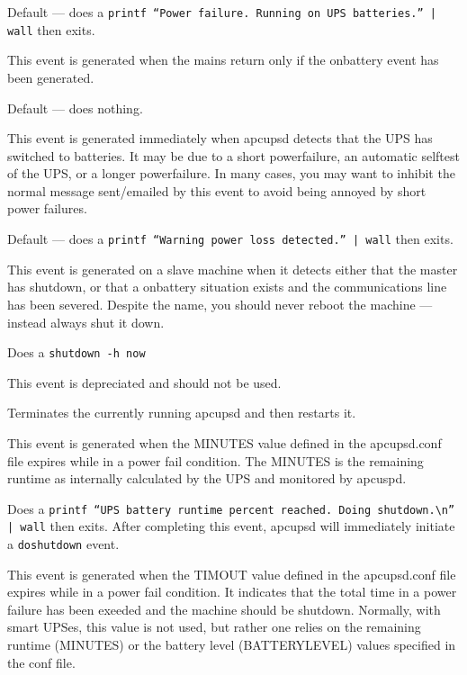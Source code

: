 {{{{{{{{{\begin{description}
Default {---} does a {\tt printf ``Power failure. Running on UPS batteries.''
| wall} then exits.  

\item [offbattery]
   This event is generated when the mains return only if the onbattery event has
been generated.  

Default {---} does nothing.  

\item [powerout]
   This event is generated immediately when apcupsd detects that the UPS has
switched to batteries. It may be due to a short powerfailure, an automatic
selftest of the UPS, or a longer powerfailure. In many cases, you may want to
inhibit the normal message sent/emailed by this event to avoid being annoyed
by short power failures.  

Default {---} does a {\tt printf ``Warning power loss detected.'' | wall} then
exits.  

\item [remotedown]
   This event is generated on a slave machine when it detects either that the
master has shutdown, or that a onbattery situation exists and the
communications line has been severed. Despite the name, you should never
reboot the machine {---} instead always shut it down.  

Does a {\tt shutdown -h now}  

\item [restartme]
   This event is depreciated and should not be used.  

Terminates the currently running apcupsd and then restarts it.  

\item [runlimit]
   This event is generated when the MINUTES value defined in the apcupsd.conf
file expires while in a power fail condition. The MINUTES is the remaining
runtime as internally calculated by the UPS and monitored by apcuspd.  

Does a {\tt printf ``UPS battery runtime percent reached. Doing
shutdown.\textbackslash{}n'' | wall} then exits.  After completing this event,
apcupsd will immediately initiate a {\tt doshutdown} event.  

\item [timeout]
   This event is generated when the TIMOUT value defined in the apcupsd.conf file
expires while in a power fail condition. It indicates that the total time in a
power failure has been exeeded and the machine should be shutdown. Normally,
with smart UPSes, this value is not used, but rather one relies on the
remaining runtime (MINUTES) or the battery level (BATTERYLEVEL) values
specified in the conf file.  


\end{description}}}}}}}}}}
